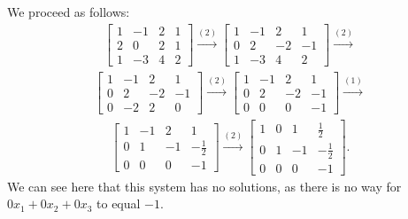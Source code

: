 \documentclass[12pt]{article}
\begin{document}
\begin{enumerate}
    We proceed as follows:
    \begin{align*}
      \begin{bmatrix}
        1 & -1 & 2 & 1\\
        2 & 0  & 2 & 1\\
        1 & -3 & 4 & 2
      \end{bmatrix}
      \xrightarrow{(2)}
      \begin{bmatrix}
        1 & -1 & 2  & 1\\
        0 & 2  & -2 & -1\\
        1 & -3 & 4  & 2
      \end{bmatrix}
      \xrightarrow{(2)}
    \end{align*}
    \begin{align*}
      \begin{bmatrix}
        1 & -1 & 2  & 1\\
        0 & 2  & -2 & -1\\
        0 & -2 & 2  & 0
      \end{bmatrix}
      \xrightarrow{(2)}
      \begin{bmatrix}
        1 & -1 & 2  & 1\\
        0 & 2  & -2 & -1\\
        0 & 0  & 0  & -1
      \end{bmatrix}
      \xrightarrow{(1)}
    \end{align*}
    \begin{align*}
      \begin{bmatrix}
        1 & -1 & 2  & 1\\
        0 & 1  & -1 & -\frac{1}{2}\\
        0 & 0  & 0  & -1
      \end{bmatrix}
      \xrightarrow{(2)}
      \begin{bmatrix}
        1 & 0 & 1  & \frac{1}{2}\\
        0 & 1 & -1 & -\frac{1}{2}\\
        0 & 0 & 0  & -1
      \end{bmatrix}.
    \end{align*}
    We can see here that this system has no solutions, as there
    is no way for $0x_1 + 0x_2 + 0x_3$ to equal $-1$.

\end{enumerate}
\end{document}
